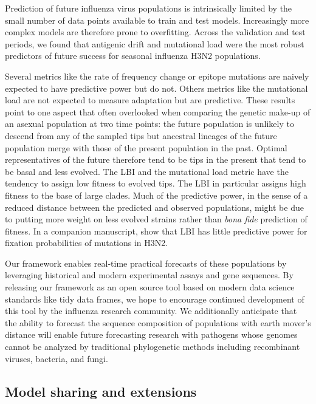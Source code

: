 Prediction of future influenza virus populations is intrinsically limited by the small number of data points available to train and test models.
Increasingly more complex models are therefore prone to overfitting.
Across the validation and test periods, we found that antigenic drift and mutational load were the most robust predictors of future success for seasonal influenza H3N2 populations.

Several metrics like the rate of frequency change or epitope mutations are naively expected to have predictive power but do not.
Others metrics like the mutational load are not expected to measure adaptation but are predictive.
These results point to one aspect that often overlooked when comparing the genetic make-up of an asexual population at two time points: the future population is unlikely to descend from any of the sampled tips but ancestral lineages of the future population merge with those of the present population in the past.
Optimal representatives of the future therefore tend to be tips in the present that tend to be basal and less evolved.
The LBI and the mutational load metric have the tendency to assign low fitness to evolved tips.
The LBI in particular assigns high fitness to the base of large clades.
Much of the predictive power, in the sense of a reduced distance between the predicted and observed populations, might be due to putting more weight on less evolved strains rather than \emph{bona fide} prediction of fitness.
In a companion manuscript, \cite{Barrat-Charlaix2020} show that LBI has little predictive power for fixation probabilities of mutations in H3N2.

Our framework enables real-time practical forecasts of these populations by leveraging historical and modern experimental assays and gene sequences.
By releasing our framework as an open source tool based on modern data science standards like tidy data frames, we hope to encourage continued development of this tool by the influenza research community.
We additionally anticipate that the ability to forecast the sequence composition of populations with earth mover's distance will enable future forecasting research with pathogens whose genomes cannot be analyzed by traditional phylogenetic methods including recombinant viruses, bacteria, and fungi.

\subsection*{Model sharing and extensions}

